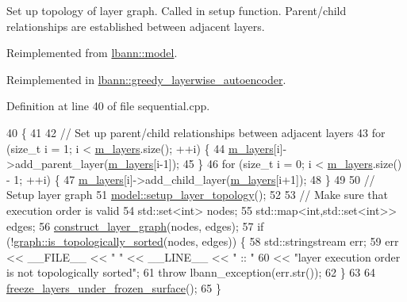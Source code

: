 Set up topology of layer graph. Called in setup function. Parent/child relationships are established between adjacent layers. 

Reimplemented from \hyperlink{classlbann_1_1model_a7b3e2a643c658dcaa7478d2568f29784}{lbann\+::model}.



Reimplemented in \hyperlink{classlbann_1_1greedy__layerwise__autoencoder_a115607e435ae4685531a81852ce01fe7}{lbann\+::greedy\+\_\+layerwise\+\_\+autoencoder}.



Definition at line 40 of file sequential.\+cpp.


\begin{DoxyCode}
40                                             \{
41 
42   \textcolor{comment}{// Set up parent/child relationships between adjacent layers}
43   \textcolor{keywordflow}{for} (\textcolor{keywordtype}{size\_t} i = 1; i < \hyperlink{classlbann_1_1model_a0229fc226ec163d1411548446104569d}{m\_layers}.size(); ++i) \{
44     \hyperlink{classlbann_1_1model_a0229fc226ec163d1411548446104569d}{m\_layers}[i]->add\_parent\_layer(\hyperlink{classlbann_1_1model_a0229fc226ec163d1411548446104569d}{m\_layers}[i-1]);
45   \}
46   \textcolor{keywordflow}{for} (\textcolor{keywordtype}{size\_t} i = 0; i < \hyperlink{classlbann_1_1model_a0229fc226ec163d1411548446104569d}{m\_layers}.size() - 1; ++i) \{
47     \hyperlink{classlbann_1_1model_a0229fc226ec163d1411548446104569d}{m\_layers}[i]->add\_child\_layer(\hyperlink{classlbann_1_1model_a0229fc226ec163d1411548446104569d}{m\_layers}[i+1]);
48   \}
49 
50   \textcolor{comment}{// Setup layer graph}
51   \hyperlink{classlbann_1_1model_a7b3e2a643c658dcaa7478d2568f29784}{model::setup\_layer\_topology}();
52 
53   \textcolor{comment}{// Make sure that execution order is valid}
54   std::set<int> nodes;
55   std::map<int,std::set<int>> edges;
56   \hyperlink{classlbann_1_1model_aef7a4775c70f96610bfc5a4605b946a5}{construct\_layer\_graph}(nodes, edges);
57   \textcolor{keywordflow}{if} (!\hyperlink{namespacelbann_1_1graph_a0dd9dcef8bc13481677692347530e328}{graph::is\_topologically\_sorted}(nodes, edges)) \{
58     std::stringstream err;
59     err << \_\_FILE\_\_ << \textcolor{stringliteral}{" "} << \_\_LINE\_\_ << \textcolor{stringliteral}{" :: "}
60         << \textcolor{stringliteral}{"layer execution order is not topologically sorted"};
61     \textcolor{keywordflow}{throw} lbann\_exception(err.str());
62   \}
63 
64   \hyperlink{classlbann_1_1model_ad0131e36e763470a7bbf67e83b42cd14}{freeze\_layers\_under\_frozen\_surface}();
65 \}
\end{DoxyCode}
